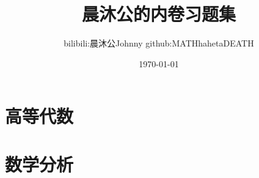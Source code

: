 \documentclass{plainbook}
\title{晨沐公的内卷习题集}
\author{bilibili:晨沐公Johnny \quad github:MATHhahetaDEATH}
\date{\today}
\begin{document}
\frontmatter



\maketitle\pagebreak

% 





% 

% 

\tableofcontents

\mainmatter

\part{高等代数}


\part{数学分析}
\setcounter{chapter}{0}




% 

% 

% 

% 

% 

% 

% 

\end{document}
